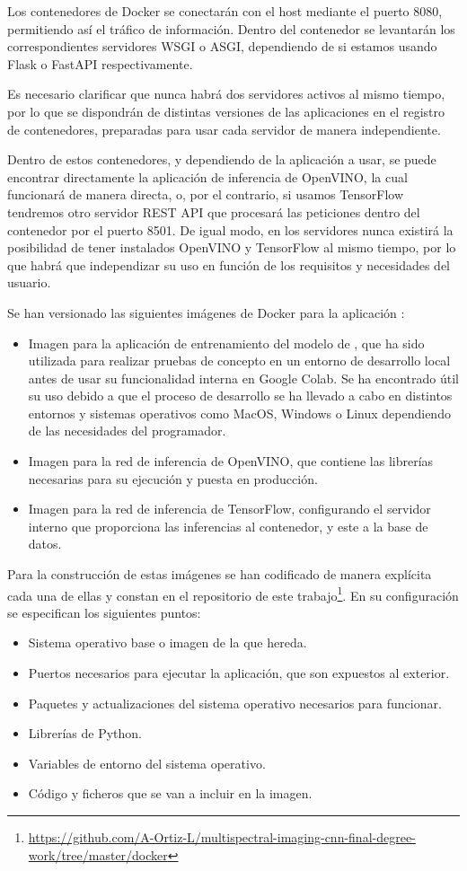 Los contenedores de Docker se conectarán con el host mediante el puerto 8080, permitiendo así el tráfico de información.
Dentro del contenedor se levantarán los correspondientes servidores WSGI o ASGI, dependiendo de si estamos usando Flask o FastAPI respectivamente.

Es necesario clarificar que nunca habrá dos servidores activos al mismo tiempo, por lo que se dispondrán de distintas versiones de las aplicaciones en el registro de contenedores, preparadas para usar cada servidor de manera independiente.

Dentro de estos contenedores, y dependiendo de la aplicación a usar, se puede encontrar directamente la aplicación de inferencia de OpenVINO, la cual funcionará de manera directa, o, por el contrario, si usamos TensorFlow tendremos otro servidor REST API que procesará las peticiones dentro del contenedor por el puerto 8501.
De igual modo, en los servidores nunca existirá la posibilidad de tener instalados OpenVINO y TensorFlow al mismo tiempo, por lo que habrá que independizar su uso en función de los requisitos y necesidades del usuario.

Se han versionado las siguientes imágenes de Docker para la aplicación :
\begin{itemize}
    \item Imagen para la aplicación de entrenamiento del modelo de , que ha sido utilizada para realizar pruebas de concepto en un entorno de desarrollo local antes de usar su funcionalidad interna en Google Colab.
    Se ha encontrado útil su uso debido a que el proceso de desarrollo se ha llevado a cabo en distintos entornos y sistemas operativos como MacOS, Windows o Linux dependiendo de las necesidades del programador.
    \item Imagen para la red de inferencia de OpenVINO, que contiene las librerías necesarias para su ejecución y puesta en producción.
    \item Imagen para la red de inferencia de TensorFlow, configurando el servidor interno que proporciona las inferencias al contenedor, y este a la base de datos.
\end{itemize}

Para la construcción de estas imágenes se han codificado de manera explícita cada una de ellas y constan en el repositorio de este trabajo\footnote{\url{https://github.com/A-Ortiz-L/multispectral-imaging-cnn-final-degree-work/tree/master/docker}}. En su configuración se especifican los siguientes puntos:
\begin{itemize}
    \item Sistema operativo base o imagen de la que hereda.
    \item Puertos necesarios para ejecutar la aplicación, que son expuestos al exterior.
    \item Paquetes y actualizaciones del sistema operativo necesarios para funcionar.
    \item Librerías de Python.
    \item Variables de entorno del sistema operativo.
    \item Código y ficheros que se van a incluir en la imagen.
\end{itemize}

